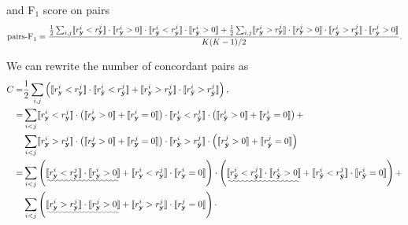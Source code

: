 and F$_1$ score on pairs
\begin{equation*}
\text{pairs-F}_1 = \frac{\frac{1}{2} \sum_{i,j} 
                   \llbracket r_{\mathbf{y}}^i < r_{\mathbf{y}}^j \rrbracket \cdot \llbracket r_{\mathbf{y}}^i > 0 \rrbracket \cdot
                   \llbracket r_{\hat{\mathbf{y}}}^i < r_{\hat{\mathbf{y}}}^j \rrbracket \cdot \llbracket r_{\hat{\mathbf{y}}}^i > 0 \rrbracket +
                   \frac{1}{2} \sum_{i,j} 
                   \llbracket r_{\mathbf{y}}^i > r_{\mathbf{y}}^j \rrbracket \cdot \llbracket r_{\mathbf{y}}^j > 0 \rrbracket \cdot
                   \llbracket r_{\hat{\mathbf{y}}}^i > r_{\hat{\mathbf{y}}}^j \rrbracket \cdot \llbracket r_{\hat{\mathbf{y}}}^j > 0 \rrbracket}{K(K-1)/2}.
\end{equation*}

We can rewrite the number of concordant pairs as
\begin{align*}
C =& \frac{1}{2} \sum_{i,j} \left(\llb r_{\mathbf{y}}^i < r_{\mathbf{y}}^j \rrb \cdot \llb r_{\hat{\mathbf{y}}}^i < r_{\hat{\mathbf{y}}}^j \rrb +
     \llb r_{\mathbf{y}}^i > r_{\mathbf{y}}^j \rrb \cdot \llb r_{\hat{\mathbf{y}}}^i > r_{\hat{\mathbf{y}}}^j \rrb \right), \\
  =& \sum_{i < j} \llb r_{\mathbf{y}}^i < r_{\mathbf{y}}^j \rrb \cdot 
     \left( \llb r_{\mathbf{y}}^i > 0 \rrb + \llb r_{\mathbf{y}}^i = 0 \rrb \right) \cdot 
     \llb r_{\hat{\mathbf{y}}}^i < r_{\hat{\mathbf{y}}}^j \rrb \cdot
     \left( \llb r_{\hat{\mathbf{y}}}^i > 0 \rrb + \llb r_{\hat{\mathbf{y}}}^i = 0 \rrb \right) + \\
   & \sum_{i < j} \llb r_{\mathbf{y}}^i > r_{\mathbf{y}}^j \rrb \cdot 
     \left( \llb r_{\mathbf{y}}^j > 0 \rrb + \llb r_{\mathbf{y}}^j = 0 \rrb \right) \cdot
     \llb r_{\hat{\mathbf{y}}}^i > r_{\hat{\mathbf{y}}}^j \rrb \cdot
     \left( \llb r_{\hat{\mathbf{y}}}^j > 0 \rrb + \llb r_{\hat{\mathbf{y}}}^j = 0 \rrb \right) \\
  =& \sum_{i < j} \left( \uwave{\llb r_{\mathbf{y}}^i < r_{\mathbf{y}}^j \rrb \cdot \llb r_{\mathbf{y}}^i > 0 \rrb} +
            \llb r_{\mathbf{y}}^i < r_{\mathbf{y}}^j \rrb \cdot \llb r_{\mathbf{y}}^i = 0 \rrb \right) \cdot 
     \left( \uwave{\llb r_{\hat{\mathbf{y}}}^i < r_{\hat{\mathbf{y}}}^j \rrb \cdot \llb r_{\hat{\mathbf{y}}}^i > 0 \rrb} + 
            \llb r_{\hat{\mathbf{y}}}^i < r_{\hat{\mathbf{y}}}^j \rrb \cdot \llb r_{\hat{\mathbf{y}}}^i = 0 \rrb \right) + \\
   & \sum_{i < j} \left( \uwave{\llb r_{\mathbf{y}}^i > r_{\mathbf{y}}^j \rrb \cdot \llb r_{\mathbf{y}}^j > 0 \rrb} + 
            \llb r_{\mathbf{y}}^i > r_{\mathbf{y}}^j \rrb \cdot \llb r_{\mathbf{y}}^j = 0 \rrb \right) \cdot

\end{align*}
